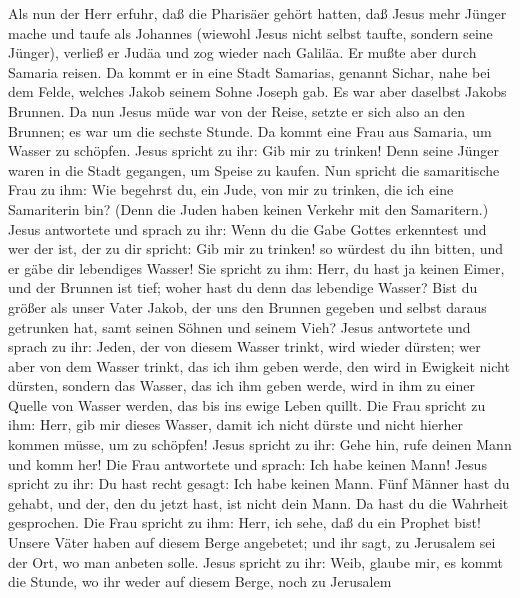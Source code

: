  Als nun der Herr erfuhr, daß die Pharisäer gehört hatten,
daß Jesus mehr Jünger mache und taufe als Johannes 
(wiewohl Jesus nicht selbst taufte, sondern seine Jünger),
 verließ er Judäa und zog wieder nach Galiläa.
 Er mußte aber durch Samaria reisen.  Da
kommt er in eine Stadt Samarias, genannt Sichar, nahe bei dem Felde,
welches Jakob seinem Sohne Joseph gab.  Es war aber
daselbst Jakobs Brunnen. Da nun Jesus müde war von der Reise, setzte er
sich also an den Brunnen; es war um die sechste Stunde. 
Da kommt eine Frau aus Samaria, um Wasser zu schöpfen. Jesus spricht zu
ihr: Gib mir zu trinken!  Denn seine Jünger waren in die
Stadt gegangen, um Speise zu kaufen.  Nun spricht die
samaritische Frau zu ihm: Wie begehrst du, ein Jude, von mir zu trinken,
die ich eine Samariterin bin? (Denn die Juden haben keinen Verkehr mit
den Samaritern.)  Jesus antwortete und sprach zu ihr:
Wenn du die Gabe Gottes erkenntest und wer der ist, der zu dir spricht:
Gib mir zu trinken! so würdest du ihn bitten, und er gäbe dir lebendiges
Wasser!  Sie spricht zu ihm: Herr, du hast ja keinen
Eimer, und der Brunnen ist tief; woher hast du denn das lebendige
Wasser?  Bist du größer als unser Vater Jakob, der uns
den Brunnen gegeben und selbst daraus getrunken hat, samt seinen Söhnen
und seinem Vieh?  Jesus antwortete und sprach zu ihr:
Jeden, der von diesem Wasser trinkt, wird wieder dürsten;
 wer aber von dem Wasser trinkt, das ich ihm geben werde,
den wird in Ewigkeit nicht dürsten, sondern das Wasser, das ich ihm
geben werde, wird in ihm zu einer Quelle von Wasser werden, das bis ins
ewige Leben quillt.  Die Frau spricht zu ihm: Herr, gib
mir dieses Wasser, damit ich nicht dürste und nicht hierher kommen
müsse, um zu schöpfen!  Jesus spricht zu ihr: Gehe hin,
rufe deinen Mann und komm her!  Die Frau antwortete und
sprach: Ich habe keinen Mann! Jesus spricht zu ihr: Du hast recht
gesagt: Ich habe keinen Mann.  Fünf Männer hast du
gehabt, und der, den du jetzt hast, ist nicht dein Mann. Da hast du die
Wahrheit gesprochen.  Die Frau spricht zu ihm: Herr, ich
sehe, daß du ein Prophet bist!  Unsere Väter haben auf
diesem Berge angebetet; und ihr sagt, zu Jerusalem sei der Ort, wo man
anbeten solle.  Jesus spricht zu ihr: Weib, glaube mir,
es kommt die Stunde, wo ihr weder auf diesem Berge, noch zu Jerusalem
